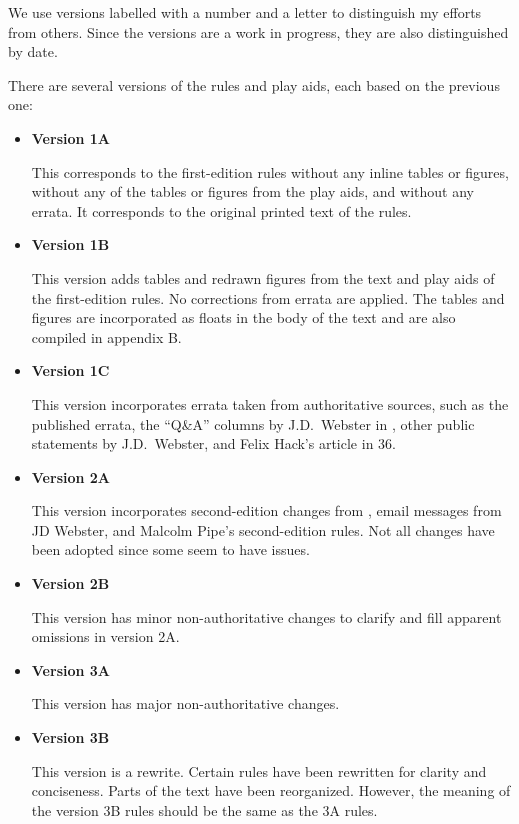 \documentclass{report}
\begin{document}
We use versions labelled with a number and a letter to distinguish my efforts from others. Since the versions are a work in progress, they are also distinguished by date.

There are several versions of the rules and play aids, each based on the previous one:

\begin{itemize}
    \item {\bfseries Version 1A}\nopagebreak

        This corresponds to the first-edition {\AirPow} rules without any inline tables or figures, without any of the tables or figures from the play aids, and without any errata. It corresponds to the original printed text of the rules.

    \item {\bfseries Version 1B}\nopagebreak

        This version adds tables and redrawn figures from the text and play aids of the first-edition {\AirPow} rules. No corrections from errata are applied. The tables and figures are incorporated as floats in the body of the text  and are also compiled in appendix B.

    \item {\bfseries Version 1C}\nopagebreak

        This version incorporates errata taken from authoritative sources, such as the published errata, the “Q\&A” columns by J.D.\ Webster in {\APJ}, other public statements by J.D.\ Webster, and Felix Hack's article in {\APJ} 36.

    \item {\bfseries Version 2A}\nopagebreak

        This version incorporates second-edition changes from {\APJ}, email messages from JD Webster, and Malcolm Pipe's second-edition rules. Not all changes have been adopted since some seem to have issues.

    \item {\bfseries Version 2B}\nopagebreak

        This version has minor non-authoritative changes to clarify and fill apparent omissions in version 2A.

    \item {\bfseries Version 3A}\nopagebreak

        This version has major non-authoritative changes.

    \item {\bfseries Version 3B}\nopagebreak

        This version is a rewrite. Certain rules have been rewritten for clarity and conciseness. Parts of the text have been reorganized. However, the meaning of the version 3B rules should be the same as the 3A rules.

\end{itemize}
\end{document}
